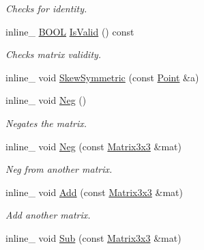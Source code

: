 \begin{DoxyCompactItemize}
\begin{DoxyCompactList}\small\item\em Checks for identity. \end{DoxyCompactList}\item 
inline\+\_\+ \hyperlink{IceTypes_8h_a050c65e107f0c828f856a231f4b4e788}{B\+O\+OL} \hyperlink{classMatrix3x3_a7a0a18d35e4a9d4f23f3ad1adff7da65}{Is\+Valid} () const \hypertarget{classMatrix3x3_a7a0a18d35e4a9d4f23f3ad1adff7da65}{}\label{classMatrix3x3_a7a0a18d35e4a9d4f23f3ad1adff7da65}

\begin{DoxyCompactList}\small\item\em Checks matrix validity. \end{DoxyCompactList}\item 
inline\+\_\+ void \hyperlink{classMatrix3x3_ae70311ba318a428a3eb5c6d011a00e9a}{Skew\+Symmetric} (const \hyperlink{classPoint}{Point} \&a)
\item 
inline\+\_\+ void \hyperlink{classMatrix3x3_a72c353f72929e8c4f703173f76f77b05}{Neg} ()\hypertarget{classMatrix3x3_a72c353f72929e8c4f703173f76f77b05}{}\label{classMatrix3x3_a72c353f72929e8c4f703173f76f77b05}

\begin{DoxyCompactList}\small\item\em Negates the matrix. \end{DoxyCompactList}\item 
inline\+\_\+ void \hyperlink{classMatrix3x3_a2fbcea9e9390924366e7b9e7216c8c0b}{Neg} (const \hyperlink{classMatrix3x3}{Matrix3x3} \&mat)\hypertarget{classMatrix3x3_a2fbcea9e9390924366e7b9e7216c8c0b}{}\label{classMatrix3x3_a2fbcea9e9390924366e7b9e7216c8c0b}

\begin{DoxyCompactList}\small\item\em Neg from another matrix. \end{DoxyCompactList}\item 
inline\+\_\+ void \hyperlink{classMatrix3x3_a2ec5f827890694e7040318034b26a02d}{Add} (const \hyperlink{classMatrix3x3}{Matrix3x3} \&mat)\hypertarget{classMatrix3x3_a2ec5f827890694e7040318034b26a02d}{}\label{classMatrix3x3_a2ec5f827890694e7040318034b26a02d}

\begin{DoxyCompactList}\small\item\em Add another matrix. \end{DoxyCompactList}\item 
inline\+\_\+ void \hyperlink{classMatrix3x3_a068602cc31da1c742896fbf333b5f6c2}{Sub} (const \hyperlink{classMatrix3x3}{Matrix3x3} \&mat)\hypertarget{classMatrix3x3_a068602cc31da1c742896fbf333b5f6c2}{}\label{classMatrix3x3_a068602cc31da1c742896fbf333b5f6c2}


\end{DoxyCompactItemize}
